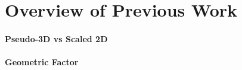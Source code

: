 \section{Overview of Previous Work}

\paragraph{Pseudo-3D vs Scaled 2D}

\paragraph{Geometric Factor}
